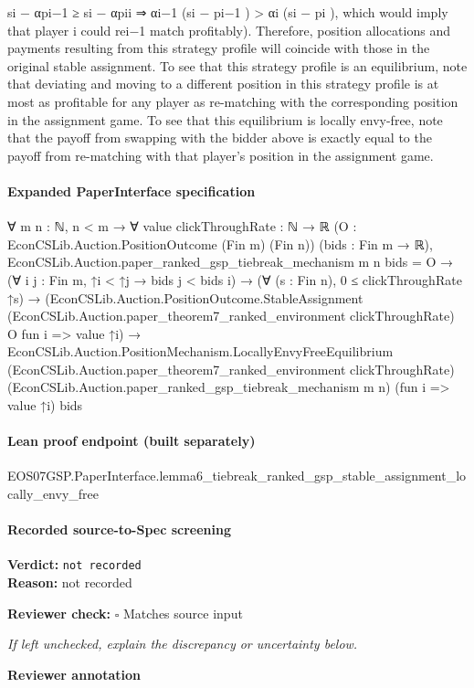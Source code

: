 \documentclass[10pt]{article}
\newcommand{\reviewerbox}{%
  \par\noindent\fbox{\parbox{0.96\linewidth}{\rule{0pt}{0.38in}}}\par
}
\newcommand{\reviewmatch}[1]{%
  \par\noindent\textbf{Reviewer check:} $\square$\; #1\par
  \noindent\emph{If left unchecked, explain the discrepancy or uncertainty below.}\par
}
\begin{document}
\begin{ReviewVerbatim}
si − αpi−1
≥ si − αpii ⇒ αi−1 (si − pi−1 ) > αi (si − pi ), which would imply that player i could rei−1
match profitably). Therefore, position allocations and payments resulting from this strategy profile
will coincide with those in the original stable assignment. To see that this strategy profile is an
equilibrium, note that deviating and moving to a different position in this strategy profile is at
most as profitable for any player as re-matching with the corresponding position in the assignment
game. To see that this equilibrium is locally envy-free, note that the payoff from swapping with
the bidder above is exactly equal to the payoff from re-matching with that player’s position in the
assignment game.
\end{ReviewVerbatim}


\paragraph{Expanded PaperInterface specification}
\begin{ReviewVerbatim}
∀ {m n : ℕ},
  n < m →
    ∀ {value clickThroughRate : ℕ → ℝ} (O : EconCSLib.Auction.PositionOutcome (Fin m) (Fin n)) (bids : Fin m → ℝ),
      EconCSLib.Auction.paper_ranked_gsp_tiebreak_mechanism m n bids = O →
        (∀ {i j : Fin m}, ↑i < ↑j → bids j < bids i) →
          (∀ (s : Fin n), 0 ≤ clickThroughRate ↑s) →
            (EconCSLib.Auction.PositionOutcome.StableAssignment
                (EconCSLib.Auction.paper_theorem7_ranked_environment clickThroughRate) O fun i => value ↑i) →
              EconCSLib.Auction.PositionMechanism.LocallyEnvyFreeEquilibrium
                (EconCSLib.Auction.paper_theorem7_ranked_environment clickThroughRate)
                (EconCSLib.Auction.paper_ranked_gsp_tiebreak_mechanism m n) (fun i => value ↑i) bids
\end{ReviewVerbatim}

\paragraph{Lean proof endpoint (built separately)}\begin{ReviewVerbatim}
EOS07GSP.PaperInterface.lemma6_tiebreak_ranked_gsp_stable_assignment_locally_envy_free
\end{ReviewVerbatim}

\paragraph{Recorded source-to-Spec screening}
\textbf{Verdict:} \texttt{not recorded}
\\
\textbf{Reason:} not recorded
\reviewmatch{Matches source input}
\noindent\textbf{Reviewer annotation}\par
\reviewerbox
\clearpage
\hypertarget{source-claim-18fbf7fc2d5e0b6c}{}
\end{document}
